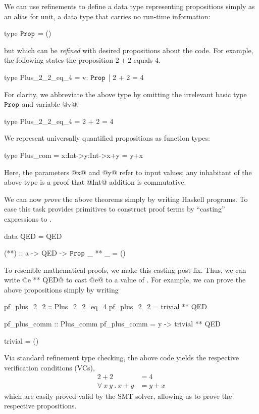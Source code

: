%
We can use refinements to define a data type
representing propositions simply as an alias
for unit, a data type that carries no run-time
information:
%
\begin{mcode}
  type $\texttt{Prop}$ = ()
\end{mcode}
%
but which can be \emph{refined} with desired
propositions about the code.
%
For example, the following states the proposition
$2 + 2$ equals $4$.
%
\begin{mcode}
  type Plus_2_2_eq_4 = {v: $\texttt{Prop}$ | 2 + 2 = 4}
\end{mcode}
%
For clarity, we abbreviate the above type by omitting
the irrelevant basic type $\texttt{Prop}$ and variable @v@:
%
\begin{mcode}
  type Plus_2_2_eq_4 = {2 + 2 = 4}
\end{mcode}
%
We represent universally quantified propositions as function types:
%
\begin{mcode}
  type Plus_com = x:Int->y:Int->{x+y = y+x}
\end{mcode}
%
Here, the parameters @x@ and @y@ refer to input
values; any inhabitant of the above type is a
proof that @Int@ addition is commutative.

%
We can now \emph{prove} the above theorems simply by
writing Haskell programs. To ease this task \toolname
provides primitives to construct proof terms by
``casting'' expressions to \typp.
%
\begin{mcode}
  data QED = QED

  (**) :: a -> QED -> $\texttt{Prop}$
  _ ** _  = ()
\end{mcode}
%
To resemble mathematical proofs, we make this casting post-fix.
Thus, we can write @e ** QED@ to cast @e@ to a value of \typp.
%
For example, we can prove the above propositions simply by writing
%
\begin{code}
  pf_plus_2_2 :: Plus_2_2_eq_4
  pf_plus_2_2 = trivial ** QED

  pf_plus_comm :: Plus_comm
  pf_plus_comm = \x y -> trivial ** QED

  trivial = ()
\end{code}
%
Via standard refinement type checking, the above code yields
the respective verification conditions (VCs),
%
\begin{align*}
                   2 + 2 & = 4 \\
\forall \ x\ y\ .\ x + y & = y + x
\end{align*}
%
which are easily proved valid by the SMT solver, allowing us
to prove the respective propositions.

